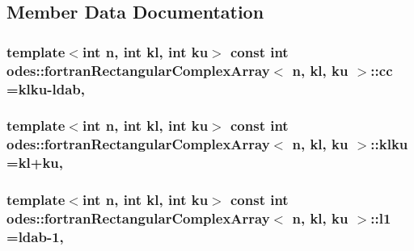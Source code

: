 \subsection{Member Data Documentation}
\hypertarget{classodes_1_1fortranRectangularComplexArray_a527c968c7a1db51e34a8c5a1c65192fb}{
\subsubsection[{cc}]{\setlength{\rightskip}{0pt plus 5cm}template$<$int n, int kl, int ku$>$ const int {\bf odes\-::fortran\-Rectangular\-Complex\-Array}$<$ n, kl, ku $>$\-::cc ={\bf klku}-\/{\bf ldab}\hspace{0.3cm}{\ttfamily [static]}, {\ttfamily [private]}}}\label{classodes_1_1fortranRectangularComplexArray_a527c968c7a1db51e34a8c5a1c65192fb}
\hypertarget{classodes_1_1fortranRectangularComplexArray_a0ec73fecad411a352df4b99c247780ca}{
\subsubsection[{klku}]{\setlength{\rightskip}{0pt plus 5cm}template$<$int n, int kl, int ku$>$ const int {\bf odes\-::fortran\-Rectangular\-Complex\-Array}$<$ n, kl, ku $>$\-::klku =kl+ku\hspace{0.3cm}{\ttfamily [static]}, {\ttfamily [private]}}}\label{classodes_1_1fortranRectangularComplexArray_a0ec73fecad411a352df4b99c247780ca}
\hypertarget{classodes_1_1fortranRectangularComplexArray_a0b1f7b8193f5ee24cfde0c6953aee714}{
\subsubsection[{l1}]{\setlength{\rightskip}{0pt plus 5cm}template$<$int n, int kl, int ku$>$ const int {\bf odes\-::fortran\-Rectangular\-Complex\-Array}$<$ n, kl, ku $>$\-::l1 ={\bf ldab}-\/1\hspace{0.3cm}{\ttfamily [static]}, {\ttfamily [private]}}}\label{classodes_1_1fortranRectangularComplexArray_a0b1f7b8193f5ee24cfde0c6953aee714}
